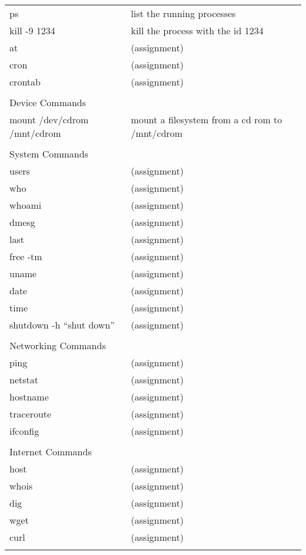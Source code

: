 \begin{center}
\begin{longtable}{|p{4cm}|p{8cm}|}
  ps & list the running processes \\
  kill -9 1234 & kill the process with the id 1234 \\
  at &  (assignment) \\
  cron &  (assignment) \\
  crontab &  (assignment) \\
  & \\

  \hline
  \multicolumn{2}{|l|}{\cellcolor{blue!15} Device Commands}\\
  \hline
  mount /dev/cdrom /mnt/cdrom & mount a filesystem from a cd rom to /mnt/cdrom\\
  & \\

  \hline
  \multicolumn{2}{|l|}{\cellcolor{blue!15} System Commands}\\
  \hline
  users &  (assignment) \\
  who &  (assignment) \\
  whoami &  (assignment) \\
  dmesg &  (assignment) \\
  last &  (assignment) \\
  free -tm &  (assignment) \\
  uname &  (assignment) \\
  date &  (assignment) \\
  time &  (assignment) \\
  shutdown -h ``shut down'' & (assignment) \\
  & \\

  \hline
  \multicolumn{2}{|l|}{\cellcolor{blue!15} Networking Commands}\\
  \hline
  ping &  (assignment) \\
  netstat &  (assignment) \\
  hostname &  (assignment) \\
  traceroute &  (assignment) \\
  ifconfig &  (assignment) \\
  & \\

  \hline
  \multicolumn{2}{|l|}{\cellcolor{blue!15} Internet Commands}\\
  \hline
  host &  (assignment) \\
  whois &  (assignment) \\
  dig &  (assignment) \\
  wget &  (assignment) \\
  curl &  (assignment) \\
  & \\


\end{longtable}
\end{center}
